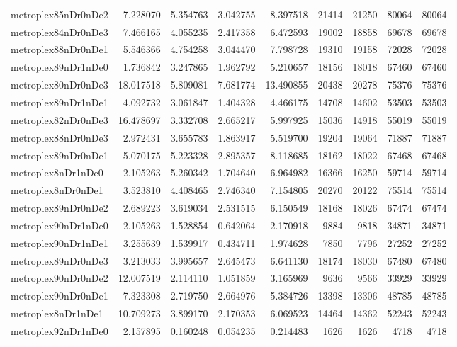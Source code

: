 \begin{longtable}{|l|r|r|r|r|r|r|r|r|}
metroplex85nDr0nDe2 & 7.228070 & 5.354763 & 3.042755 & 8.397518 & 21414 & 21250 & 80064 & 80064 \\
metroplex84nDr0nDe3 & 7.466165 & 4.055235 & 2.417358 & 6.472593 & 19002 & 18858 & 69678 & 69678 \\
metroplex88nDr0nDe1 & 5.546366 & 4.754258 & 3.044470 & 7.798728 & 19310 & 19158 & 72028 & 72028 \\
metroplex89nDr1nDe0 & 1.736842 & 3.247865 & 1.962792 & 5.210657 & 18156 & 18018 & 67460 & 67460 \\
metroplex80nDr0nDe3 & 18.017518 & 5.809081 & 7.681774 & 13.490855 & 20438 & 20278 & 75376 & 75376 \\
metroplex89nDr1nDe1 & 4.092732 & 3.061847 & 1.404328 & 4.466175 & 14708 & 14602 & 53503 & 53503 \\
metroplex82nDr0nDe3 & 16.478697 & 3.332708 & 2.665217 & 5.997925 & 15036 & 14918 & 55019 & 55019 \\
metroplex88nDr0nDe3 & 2.972431 & 3.655783 & 1.863917 & 5.519700 & 19204 & 19064 & 71887 & 71887 \\
metroplex89nDr0nDe1 & 5.070175 & 5.223328 & 2.895357 & 8.118685 & 18162 & 18022 & 67468 & 67468 \\
metroplex8nDr1nDe0 & 2.105263 & 5.260342 & 1.704640 & 6.964982 & 16366 & 16250 & 59714 & 59714 \\
metroplex8nDr0nDe1 & 3.523810 & 4.408465 & 2.746340 & 7.154805 & 20270 & 20122 & 75514 & 75514 \\
metroplex89nDr0nDe2 & 2.689223 & 3.619034 & 2.531515 & 6.150549 & 18168 & 18026 & 67474 & 67474 \\
metroplex90nDr1nDe0 & 2.105263 & 1.528854 & 0.642064 & 2.170918 & 9884 & 9818 & 34871 & 34871 \\
metroplex90nDr1nDe1 & 3.255639 & 1.539917 & 0.434711 & 1.974628 & 7850 & 7796 & 27252 & 27252 \\
metroplex89nDr0nDe3 & 3.213033 & 3.995657 & 2.645473 & 6.641130 & 18174 & 18030 & 67480 & 67480 \\
metroplex90nDr0nDe2 & 12.007519 & 2.114110 & 1.051859 & 3.165969 & 9636 & 9566 & 33929 & 33929 \\
metroplex90nDr0nDe1 & 7.323308 & 2.719750 & 2.664976 & 5.384726 & 13398 & 13306 & 48785 & 48785 \\
metroplex8nDr1nDe1 & 10.709273 & 3.899170 & 2.170353 & 6.069523 & 14464 & 14362 & 52243 & 52243 \\
metroplex92nDr1nDe0 & 2.157895 & 0.160248 & 0.054235 & 0.214483 & 1626 & 1626 & 4718 & 4718 \\

\end{longtable}
